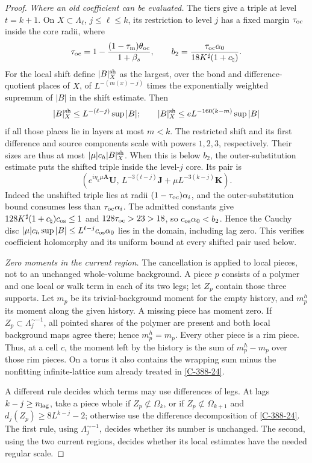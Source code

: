 \documentclass[11pt,letterpaper,reqno]{amsart}
\theoremstyle{definition}
\theoremstyle{remark}
\begin{document}
\begin{proof}
\emph{Where an old coefficient can be evaluated.}
The tiers give a triple at level $t=k+1$. On
$X\subset\Lambda_\ell$, $j\le\ell\le k$, its
restriction to level $j$ has a fixed margin
$\tau_{\rm oc}$ inside the core radii, where
\[
 \tau_{\rm oc}
 =1-\frac{(1-\tau_{\rm m})\theta_{\rm oc}}{1+\beta_s},
 \qquad
 b_2=\frac{\tau_{\rm oc}\alpha_0}
             {18K^\sharp(1+c_\natural)}.
\]
For the local shift define
$|B|_X^{\rm sh}$ as the largest, over the bond
and difference-quotient places of $X$, of
$L^{-(m(x)-j)}$ times the exponentially weighted
supremum of $|B|$ in the shift estimate.
Then
\[
 |B|_X^{\rm sh}\le L^{-(\ell-j)}\sup|B|;
 \qquad
 |B|_X^{\rm sh}\le eL^{-160(k-m)}\sup|B|
\]
if all those places lie in layers at most $m<k$.
The restricted shift and its first difference and
source components scale with powers $1,2,3$,
respectively. Their sizes are thus at most
$|\mu|c_h|B|_X^{\rm sh}$.
When this is below $b_2$, the outer-substitution
estimate puts the shifted triple inside the
level-$j$ core. Its pair is
\[
 \left(e^{i\eta_k\mu\mathbf A}\mathbf U,\,
       L^{-3(t-j)}\mathbf J+
                         \mu L^{-3(k-j)}\mathbf K\right).
\]
Indeed the unshifted triple lies at radii
$(1-\tau_{\rm oc})\alpha_i$, and the
outer-substitution bound consumes less than
$\tau_{\rm oc}\alpha_i$. The admitted constants give
$128K^\sharp(1+c_\natural)c_{\rm os}\le1$ and
$128\tau_{\rm oc}>23>18$, so
$c_{\rm os}\alpha_0<b_2$. Hence the Cauchy disc
$|\mu|c_h\sup|B|\le L^{\ell-j}c_{\rm os}\alpha_0$
lies in the domain, including lag zero. This
verifies coefficient holomorphy and its uniform
bound at every shifted pair used below.

\emph{Zero moments in the current region.}
The cancellation is applied to local pieces,
not to an unchanged whole-volume background.
A piece $p$ consists of a polymer and one
local or walk term in each of its two legs;
let $Z_p$ contain those three supports.
Let $m_p$ be its trivial-background moment for
the empty history, and $m_p^h$ its moment along
the given history. A missing piece has moment
zero. If $Z_p\subset\Lambda_j^{\sim-1}$, all
pointed shares of the polymer are present and
both local background maps agree there; hence
$m_p^h=m_p$. Every other piece is a rim piece.
Thus, at a cell $c$, the moment left by the
history is the sum of $m_p^h-m_p$ over those
rim pieces. On a torus it also contains the
wrapping sum minus the nonfitting infinite-lattice
sum already treated in \cref{C-388-24}.

A different rule decides which terms may use
differences of legs. At lags $k-j\ge n_{\rm lag}$,
take a piece whole if $Z_p\not\subset\Omega_k$,
or if $Z_p\not\subset\Omega_{k+1}$ and
$d_j(Z_p)\ge8L^{k-j}-2$; otherwise use the
difference decomposition of \cref{C-388-24}.
The first rule, using $\Lambda_j^{\sim-1}$,
decides whether its number is unchanged. The
second, using the two current regions, decides
whether its local estimates have the needed
regular scale.


\end{proof}
\end{document}
